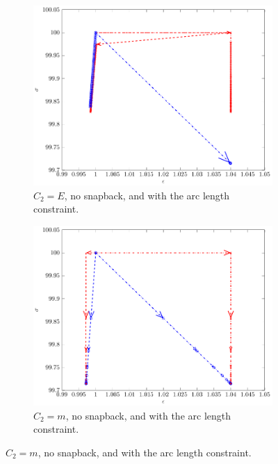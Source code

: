 \documentclass[11pt]{elsarticle}
\begin{document}
\begin{figure}[]
\begin{subfigure}{0.45\textwidth}
		\centering
		\includegraphics[scale=0.7]{./conv_figs/bad_metric_no_snap_arc_length.pdf}
		\caption{$C_2=E$, no snapback, and with the arc length constraint.}
		\label{bad_metric_no_snap_arc_length}
	\end{subfigure}
	\hfill
	\begin{subfigure}{0.45\textwidth}
		\centering
		\includegraphics[scale=0.7]{./conv_figs/good_metric_no_snap_arc_length.pdf}
		\caption{$C_2=m$, no snapback, and with the arc length constraint.}
		\label{good_metric_no_snap_arc_length}
	\end{subfigure}
\end{figure}
\end{document}

